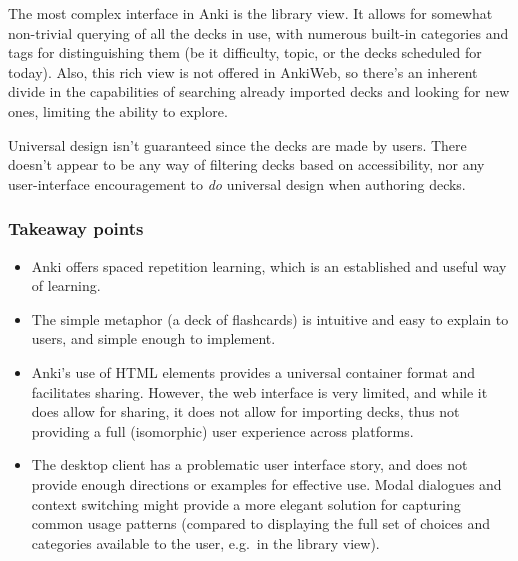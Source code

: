 The most complex interface in Anki is the library view. It allows for somewhat
non-trivial querying of all the decks in use, with numerous built-in categories
and tags for distinguishing them (be it difficulty, topic, or the decks
scheduled for today). Also, this rich view is not offered in AnkiWeb, so there's
an inherent divide in the capabilities of searching already imported decks and
looking for new ones, limiting the ability to explore.

Universal design isn't guaranteed since the decks are made by users. There 
doesn't appear to be any way of filtering decks based on accessibility, nor 
any user-interface encouragement to \emph{do} universal design when authoring 
decks.

\subsubsection{Takeaway points}

\begin{itemize}
\item Anki offers spaced repetition learning, which is an established and 
  useful way of learning.
\item The simple metaphor (a deck of flashcards) is intuitive and easy to 
    explain to users\cite{burke2002s}, and simple enough to implement.
\item Anki's use of HTML elements provides a universal container format and
  facilitates sharing. However, the web interface is very limited, and while it
  does allow for sharing, it does not allow for importing decks, thus not
  providing a full (isomorphic) user experience across platforms.
\item The desktop client has a problematic user interface story, and does not
  provide enough directions or examples for effective use. Modal dialogues and
  context switching might provide a more elegant solution for capturing common
  usage patterns (compared to displaying the full set of choices and categories
  available to the user, e.g.\ in the library view).
\end{itemize}

